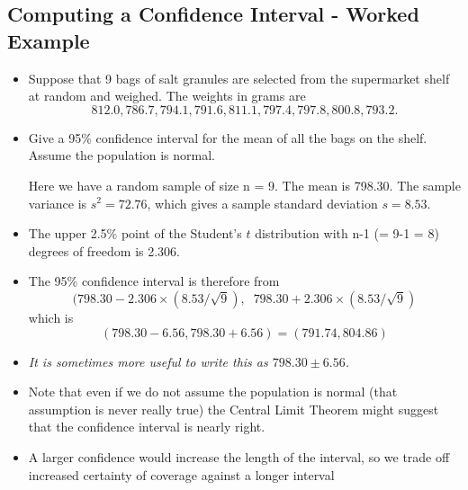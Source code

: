 \subsection{Computing a Confidence Interval - Worked Example}
\begin{itemize}
\item Suppose that 9 bags of salt granules are selected from the supermarket
shelf at random and weighed. The weights in grams are \[812.0, 786.7, 794.1,
791.6, 811.1, 797.4, 797.8, 800.8, 793.2.\] 
\item Give a 95\% confidence interval for the
mean of all the bags on the shelf. Assume the population is normal.


Here we have a random sample of size n = 9. The mean is 798.30. The sample
variance is $s^2 = 72.76$, which gives a sample standard deviation $s = 8.53$.

\item The upper 2.5\% point of the Student's $t$ distribution with n-1 (= 9-1 = 8) degrees of freedom is 2.306.

\item The 95\% confidence interval is therefore from 
\[(798.30 - 2.306 \times (8.53/\sqrt{9}),\;\; 798.30 + 2.306 \times (8.53/\sqrt{9})\]
which is\\
\[(798.30 - 6.56, 798.30 + 6.56) = (791.74, 804.86)\]
\item \textit{It is sometimes more useful to write this as $798.30 \pm 6.56$.}

\item Note that even if we do not assume the population is normal (that assumption is
never really true) the Central Limit Theorem might suggest that the confidence interval
is nearly right. 
\item A larger confidence would increase the length of the interval, so we
trade off increased certainty of coverage against a longer interval
\end{itemize}

